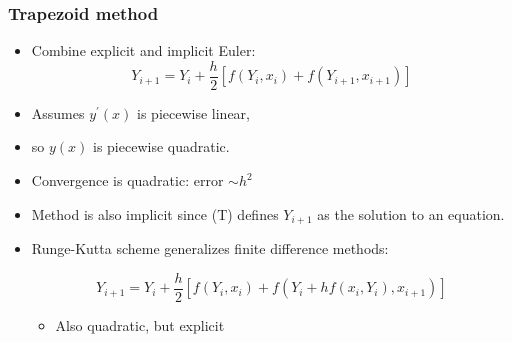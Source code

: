 \documentclass[bigger,handout]{beamer}
\newenvironment{stepitemize}{\begin{itemize}[<+->]}{\end{itemize} }
\begin{document}
\begin{frame}%
  
\frametitle{Trapezoid method}

\begin{stepitemize}
\item Combine explicit and implicit Euler:%
\begin{equation}
Y_{i+1}=Y_{i}+\frac{h}{2}\left[ f(Y_{i},x_{i})+f(Y_{i+1},x_{i+1})\right] 
\tag{T}
\end{equation}

\item Assumes $y^{\prime }(x)$ is piecewise linear,

\item so $y(x)$ is piecewise quadratic.

\item Convergence is quadratic: error $\sim h^{2}$

\item Method is also implicit since (T) defines $Y_{i+1}$ \newline
as the solution to an equation.\bigskip

\item Runge-Kutta scheme generalizes finite difference methods:

\begin{equation*}
Y_{i+1}=Y_{i}+\frac{h}{2}\left[ f(Y_{i},x_{i})+f(Y_{i}+hf(x_i,Y_i),x_{i+1})\right] 
\end{equation*}
\begin{stepitemize}
\item Also quadratic, but explicit
\end{stepitemize}
\end{stepitemize}

  
 
\end{frame}%
  
 
 
\end{document}

